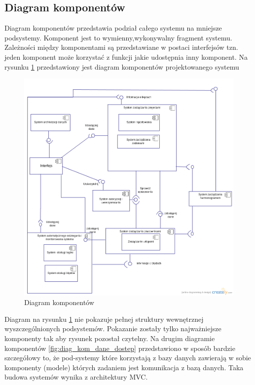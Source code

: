 \subsection{Diagram komponentów}
\begin{adjustwidth}{2em}{0pt}
Diagram komponentów przedstawia podział całego systemu na mniejsze podsystemy. Komponent jest to wymienny,wykonywalny fragment systemu. Zależności między komponentami są przedstawiane w postaci interfejsów tzn. jeden komponent może korzystać z funkcji jakie udostępnia inny komponent. Na rysunku \ref{fig:diagram_komponentow} przedstawiony jest diagram komponentów projektowanego systemu

\begin{figure}[H]
    \centering
    \includegraphics[scale=0.4]{diagramy/sekwencji_i_komponentow/diagram_komponentow.png}
    \caption{Diagram komponentów}
    \label{fig:diagram_komponentow}
\end{figure} 

Diagram na rysunku \ref{fig:diagram_komponentow} nie pokazuje pełnej struktury wewnętrznej wyszczególnionych podsystemów. Pokazanie zostały tylko najważniejsze komponenty tak aby rysunek pozostał czytelny. Na drugim diagramie komponentów \ref{fig:diag_kom_dane_dostep} przedstawiono w sposób bardzie szczegółowy to, że pod-systemy które korzystają z bazy danych zawierają w sobie komponenty (modele) których zadaniem jest komunikacja z bazą danych. Taka budowa systemów wynika z architektury MVC.


\end{adjustwidth}
